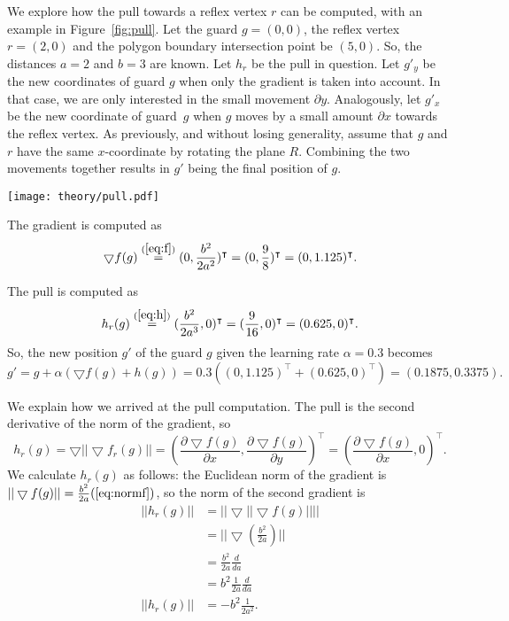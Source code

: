 We explore how the pull towards a reflex vertex $r$ can be computed, with an example in Figure~\ref{fig:pull}. Let the guard $g = (0, 0)$, the reflex vertex $r = (2, 0)$ and the polygon boundary intersection point be $(5, 0)$. So, the distances $a = 2$ and $b = 3$ are known. Let $h_r$ be the pull in question. Let $g'_y$ be the new coordinates of guard $g$ when only the gradient is taken into account. In that case, we are only interested in the small movement $\partial y$. Analogously, let $g'_x$ be the new coordinate of guard~$g$ when $g$ moves by a small amount $\partial x$ towards the reflex vertex. As previously, and without losing generality, assume that $g$ and $r$ have the same $x$-coordinate by rotating the plane $R$. Combining the two movements together results in $g'$ being the final position of $g$.

\begin{figure*}[!h]
    \texttt{[image: theory/pull.pdf]}
    \centering
    \caption{Computing the movements of the guard $g$ based on both the gradient and the pull towards reflex vertex $r$. The new position of the guard with learning rate $\alpha = 0.3$ becomes $g' = (0.1875, 0.3375)$.}
    \label{fig:pull}
\end{figure*}

The gradient is computed as
$$\bigtriangledown f(g) \overset{(\ref{eq:f})}{=} (0, \frac{b^2}{2a^2})^\intercal = (0, \frac{9}{8})^\intercal = (0, 1.125)^\intercal.$$ 

The pull is computed as 
$$h_r(g) \overset{(\ref{eq:h})}{=} (\frac{b^2}{2a^3}, 0)^\intercal = (\frac{9}{16}, 0)^\intercal = (0.625, 0)^\intercal.$$
So, the new position $g'$ of the guard $g$ given the learning rate $\alpha = 0.3$ becomes 
$$g' = g + \alpha(\bigtriangledown f(g) + h(g)) = 0.3 ((0, 1.125)^\intercal + (0.625, 0)^\intercal) = (0.1875, 0.3375).$$

We explain how we arrived at the pull computation. The pull is the second derivative of the norm of the gradient, so 
$$h_r(g) = \bigtriangledown ||\bigtriangledown f_r(g)|| = \left(\frac{\partial \bigtriangledown f(g)}{\partial x}, \frac{\partial \bigtriangledown f(g)}{\partial y}\right)^\intercal = \left(\frac{\partial \bigtriangledown f(g)}{\partial x}, 0\right)^\intercal.$$  
We calculate $h_r(g)$ as follows: the Euclidean norm of the gradient is $||\bigtriangledown f(g)|| = \frac{b^2}{2a} (\ref{eq:normf})$, so the norm of the second gradient is 
\begin{align*}
||h_r(g)||&= ||\bigtriangledown ||\bigtriangledown f(g)|||| \\
       &= ||\bigtriangledown (\frac{b^2}{2a})|| \\
       &= \frac{b^2}{2a}\frac{d}{da} \\
       &= b^2\frac{1}{2a}\frac{d}{da} \\
||h_r(g)||&= -b^2\frac{1}{2a^2}.
\end{align*}

